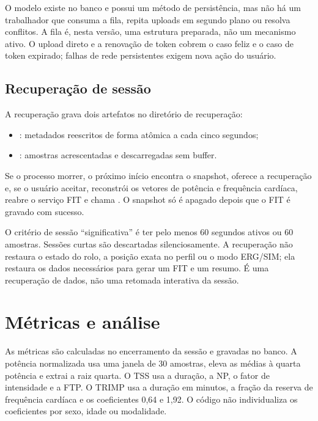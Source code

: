 O modelo  existe no banco e possui um método de persistência,
mas não há um trabalhador que consuma a fila, repita uploads em segundo plano ou
resolva conflitos. A fila é, nesta versão, uma estrutura preparada, não um
mecanismo ativo. O upload direto e a renovação de token cobrem o caso feliz e o
caso de token expirado; falhas de rede persistentes exigem nova ação do usuário.

\subsection{Recuperação de sessão}
\label{sec:implementacao-recovery}

A recuperação grava dois artefatos no diretório de recuperação:

\begin{itemize}
    \item {}: metadados reescritos de forma atômica a
        cada cinco segundos;
    \item {}: amostras acrescentadas e descarregadas
        sem buffer.
\end{itemize}

\noindent Se o processo morrer, o próximo início encontra o snapshot, oferece
a recuperação e, se o usuário aceitar, reconstrói os vetores de potência e
frequência cardíaca, reabre o serviço FIT e chama . O
snapshot só é apagado depois que o FIT é gravado com sucesso.

O critério de sessão ``significativa'' é ter pelo menos 60 segundos ativos ou 60
amostras. Sessões curtas são descartadas silenciosamente. A recuperação não
restaura o estado do rolo, a posição exata no perfil ou o modo ERG/SIM; ela
restaura os dados necessários para gerar um FIT e um resumo. É uma recuperação
de dados, não uma retomada interativa da sessão.

\section{Métricas e análise}
\label{sec:implementacao-metricas}

As métricas são calculadas no encerramento da sessão e gravadas no banco. A
potência normalizada usa uma janela de 30 amostras, eleva as médias à quarta
potência e extrai a raiz quarta. O TSS usa a duração, a NP, o fator de
intensidade e a FTP. O TRIMP usa a duração em minutos, a fração da reserva de
frequência cardíaca e os coeficientes 0,64 e 1,92. O código não individualiza
os coeficientes por sexo, idade ou modalidade.

